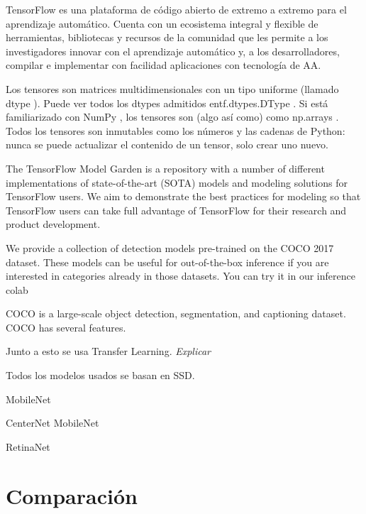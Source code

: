 TensorFlow es una plataforma de código abierto de extremo a extremo para el aprendizaje automático. Cuenta con un ecosistema integral y flexible de herramientas, bibliotecas y recursos de la comunidad que les permite a los investigadores innovar con el aprendizaje automático y, a los desarrolladores, compilar e implementar con facilidad aplicaciones con tecnología de AA.

Los tensores son matrices multidimensionales con un tipo uniforme (llamado dtype ). Puede ver todos los dtypes admitidos entf.dtypes.DType . Si está familiarizado con NumPy , los tensores son (algo así como) como np.arrays . Todos los tensores son inmutables como los números y las cadenas de Python: nunca se puede actualizar el contenido de un tensor, solo crear uno nuevo.

The TensorFlow Model Garden is a repository with a number of different implementations of state-of-the-art (SOTA) models and modeling solutions for TensorFlow users. We aim to demonstrate the best practices for modeling so that TensorFlow users can take full advantage of TensorFlow for their research and product development.

We provide a collection of detection models pre-trained on the COCO 2017 dataset. These models can be useful for out-of-the-box inference if you are interested in categories already in those datasets. You can try it in our inference colab

COCO is a large-scale object detection, segmentation, and captioning dataset. COCO has several features.

Junto a esto se usa Transfer Learning. \textit{Explicar}

Todos los modelos usados se basan en SSD.

MobileNet

CenterNet MobileNet

RetinaNet


\newpage
\section{Comparación}